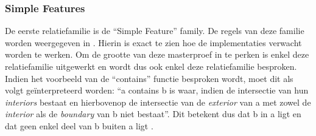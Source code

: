 \subsubsection{Simple Features}
\label{subsubsec:simple_features}
De eerste relatiefamilie is de ``Simple Feature'' family. De regels van deze familie worden weergegeven in . Hierin is exact te zien hoe de implementaties verwacht worden te werken. Om de grootte van deze masterproef in te perken is enkel deze relatiefamilie uitgewerkt en wordt dus ook enkel deze relatiefamilie besproken. Indien het voorbeeld van de ``contains'' functie besproken wordt, moet dit als volgt geïnterpreteerd worden: ``a contains b is waar, indien de intersectie van hun \textit{interiors} bestaat en hierbovenop de intersectie van de \textit{exterior} van a met zowel de \textit{interior} als de \textit{boundary} van b niet bestaat''. Dit betekent dus dat b in a ligt en dat geen enkel deel van b buiten a ligt \cite{ogcdocs}.


